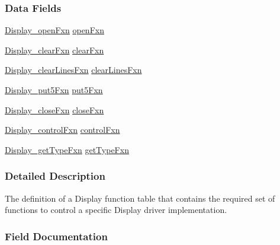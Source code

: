 \subsubsection*{Data Fields}
\begin{DoxyCompactItemize}
\item 
\hyperlink{_display_8h_a3119ce57fb115a68a37d7ec274cb0001}{Display\+\_\+open\+Fxn} \hyperlink{struct_display___fxn_table_a66473aac0719cf33382770aab5e51f7f}{open\+Fxn}
\item 
\hyperlink{_display_8h_af09f13daab765e83adfac09551e3ee51}{Display\+\_\+clear\+Fxn} \hyperlink{struct_display___fxn_table_ac2db3a7d155afd3bf0f83a125d3e1745}{clear\+Fxn}
\item 
\hyperlink{_display_8h_a8350bd25609f51433e21b502ed50f63a}{Display\+\_\+clear\+Lines\+Fxn} \hyperlink{struct_display___fxn_table_a50c9960307eb7abdddeaea450f2b413d}{clear\+Lines\+Fxn}
\item 
\hyperlink{_display_8h_a86694b64b96c51c587e649d82537746d}{Display\+\_\+put5\+Fxn} \hyperlink{struct_display___fxn_table_a3eb374194ea092391f7356f0a9aad1b5}{put5\+Fxn}
\item 
\hyperlink{_display_8h_ade8c953094781efff0f10ee0696a984f}{Display\+\_\+close\+Fxn} \hyperlink{struct_display___fxn_table_ab87c3ac60591e2f8276ca68e372a0eec}{close\+Fxn}
\item 
\hyperlink{_display_8h_a67b559ffeebd829633512c4381858cc1}{Display\+\_\+control\+Fxn} \hyperlink{struct_display___fxn_table_a8fc3ff1c182a8c00cbbbbe182dacba8a}{control\+Fxn}
\item 
\hyperlink{_display_8h_a2800d49b89aa7e3d9a2ec758d60358f1}{Display\+\_\+get\+Type\+Fxn} \hyperlink{struct_display___fxn_table_a77c12532ad85c855dd889b28d7d5a282}{get\+Type\+Fxn}
\end{DoxyCompactItemize}


\subsubsection{Detailed Description}
The definition of a Display function table that contains the required set of functions to control a specific Display driver implementation. 

\subsubsection{Field Documentation}
